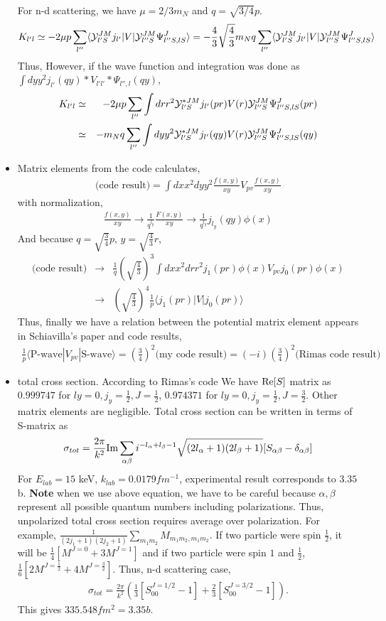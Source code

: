 \documentclass[10pt]{article}
\newcommand{\bea}{\begin{eqnarray}}
\newcommand{\eea}{\end{eqnarray}}
\newcommand{\no}{\nonumber \\}
\def\la{\langle}
\def\ra{\rangle}
\begin{document}
\begin{itemize}
For n-d scattering, we have $\mu=2/3 m_N$ and $q=\sqrt{3/4} p$.
\bea
K_{l'l}\simeq -2\mu p \sum_{l''} 
               \la {\cal Y}^{JM}_{l'S} j_{l'}|V|
                   {\cal Y}^{JM}_{l'' S} \Psi_{l''S,lS}^J\ra     
           =-\frac{4}{3}\sqrt{\frac{4}{3}} m_N q
            \sum_{l''} 
               \la {\cal Y}^{JM}_{l'S} j_{l'}|V|
                   {\cal Y}^{JM}_{l'' S} \Psi_{l''S,lS}^J\ra         
\eea 
Thus, 
However, if the wave function and integration was done as
$\int dy y^2 j_{l'}(qy)*V_{l'l'}*\Psi_{l'',l}(qy)$,
\bea
K_{l'l}&\simeq& -2\mu p \sum_{l''} 
               \int dr r^2 {\cal Y}^{*JM}_{l'S} j_{l'}(pr) V(r)
                   {\cal Y}^{JM}_{l'' S} \Psi_{l''S,lS}^J(pr)
              \no
              &\simeq& -m_N q \sum_{l''} \int dy y^2 
               {\cal Y}^{* JM}_{l'S} j_{l'}(qy) V(r)
               {\cal Y}^{JM}_{l'' S} \Psi_{l''S,lS}^J(qy)   
\eea

\item Matrix elements from the code calculates,
\bea
\mbox{(code result)}=\int dx x^2 dy y^2 \frac{f(x,y)}{xy} V_{pv}
                                        \frac{f(x,y)}{xy}   
\eea
with normalization,
\bea
\frac{f(x,y)}{xy}\to \frac{1}{q^{l_y}}\frac{F(x,y)}{xy} 
\to \frac{1}{q^{l_y}} j_{l_y}(q y)\phi(x)
\eea  
And because $q=\sqrt{\frac{3}{4}}p$, $y=\sqrt{\frac{4}{3}}r$,
\bea
\mbox{(code result)}&\to& 
\frac{1}{q}(\sqrt{\frac{4}{3}})^3
\int dx x^2 dr r^2 j_1( pr)\phi(x) V_{pv} j_0(pr)\phi(x)\no
&\to& (\sqrt{\frac{4}{3}})^4 \frac{1}{p}
    \la j_1(pr)|V|j_0(pr)\ra
\eea 
Thus, finally we have a relation
between the potential matrix element appears in 
Schiavilla's paper and code results,
\bea
\frac{1}{p}\la \mbox{P-wave}|V_{pv}|\mbox{S-wave}\ra
=(\frac{3}{4})^2 \mbox{(my code result)}
=(-i)(\frac{3}{4})^2 \mbox{(Rimas code result)}
\eea

\item total cross section.
According to Rimas's code We have ${\rm Re}[S]$ matrix as
$0.999747$ for $ly=0,j_y=\frac{1}{2},J=\frac{1}{2}$,
$0.974371$ for $ly=0,j_y=\frac{1}{2},J=\frac{3}{2}$.
Other matrix elements are negligible.
Total cross section can be written in terms of S-matrix as
\bea
\sigma_{tot}=\frac{2\pi}{k^2}{\rm Im}\sum_{\alpha\beta}i^{-l_\alpha+l_\beta-1}\sqrt{(2l_\alpha+1)(2l_\beta+1)}[S_{\alpha\beta}-\delta_{\alpha\beta}]
\eea
For $E_{lab}=15$ keV, $k_{lab}=0.0179 fm^{-1}$, experimental result
corresponds to $3.35$ b. {\bf Note} when we use above equation,
we have to be careful because $\alpha,\beta$ represent
all possible quantum numbers including polarizations.
Thus, unpolarized total cross section requires average 
over polarization. 
For example, 
$\frac{1}{(2j_1+1)(2j_2+1)}\sum_{m_1 m_2} M_{m_1m_2,m_1m_2}$.
If two particle were spin $\frac{1}{2}$, it will be
$\frac{1}{4}[M^{J=0}+3 M^{J=1}]$ and if two particle were
spin $1$ and $\frac{1}{2}$,
$\frac{1}{6}[2 M^{J=\frac{1}{2}}+4 M^{J=\frac{3}{2}}]$.
Thus, n-d scattering case,
\bea
\sigma_{tot}=\frac{2\pi}{k^2}(\frac{1}{3}[S^{J=1/2}_{00}-1]
+\frac{2}{3}[S^{J=3/2}_{00}-1]).
\eea 
This gives $335.548 fm^2=3.35b$. 


\end{itemize}
\end{document}
